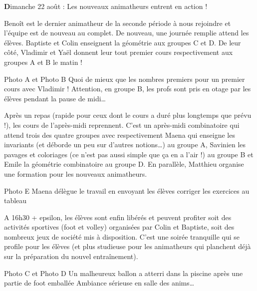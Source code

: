 \begin{center}
{\textbf Dimanche 22 août : Les nouveaux animatheurs entrent en action !}
\end{center}
\vspace{2mm}

Benoît est le dernier animatheur de la seconde période à nous rejoindre et l’équipe est de nouveau au complet. De nouveau, une journée remplie attend les élèves. Baptiste et Colin enseignent la géométrie aux groupes C et D. De leur côté, Vladimir et Yaël donnent leur tout premier cours respectivement aux groupes A et B le matin !

Photo A et Photo B
Quoi de mieux que les nombres premiers pour un premier cours avec Vladimir !
Attention, en groupe B, les profs sont pris en otage par les élèves pendant la pause de midi…

Après un repas (rapide pour ceux dont le cours a duré plus longtemps que prévu !), les cours de l’après-midi reprennent. C’est un après-midi combinatoire qui attend trois des quatre groupes avec respectivement Maena qui enseigne les invariants (et déborde un peu sur d’autres notions…) au groupe A, Savinien les pavages et coloriages (ce n’est pas aussi simple que ça en a l’air !) au groupe B et Emile la géométrie combinatoire au groupe D. En parallèle, Matthieu organise une formation pour les nouveaux animatheurs.

Photo E
Maena délègue le travail en envoyant les élèves corriger les exercices au tableau

A 16h30 + epsilon, les élèves sont enfin libérés et peuvent profiter soit des activités sportives (foot et volley) organisées par Colin et Baptiste, soit des nombreux jeux de société mis à disposition. C’est une soirée tranquille qui se profile pour les élèves (et plus studieuse pour les animatheurs qui planchent déjà sur la préparation du nouvel entraînement).

Photo C et Photo D
Un malheureux ballon a atterri dans la piscine après une partie de foot emballée
Ambiance sérieuse en salle des anims…